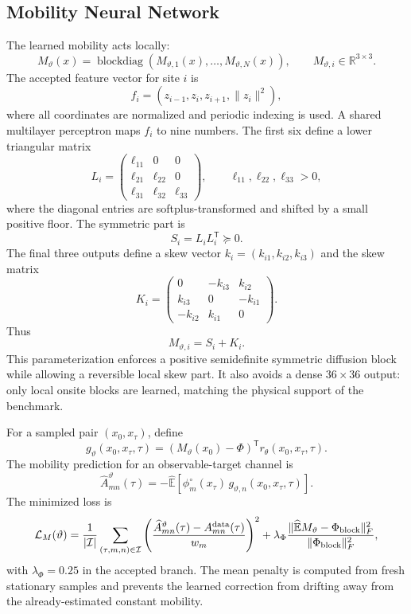 \documentclass[11pt]{article}
\newcommand{\R}{\mathbb{R}}
\newcommand{\E}{\mathbb{E}}
\newcommand{\T}{\mathsf{T}}
\begin{document}
\subsection{Mobility Neural Network}

The learned mobility acts locally:
\[
  M_\vartheta(x)=\operatorname{blockdiag}
  \left(M_{\vartheta,1}(x),\ldots,M_{\vartheta,N}(x)\right),
  \qquad
  M_{\vartheta,i}\in\R^{3\times3}.
\]
The accepted feature vector for site $i$ is
\[
  f_i
  =
  \left(
    z_{i-1},z_i,z_{i+1},\|z_i\|^2
  \right),
\]
where all coordinates are normalized and periodic indexing is used.  A shared
multilayer perceptron maps $f_i$ to nine numbers.  The first six define a lower
triangular matrix
\[
  L_i=
  \begin{pmatrix}
    \ell_{11} & 0 & 0\\
    \ell_{21} & \ell_{22} & 0\\
    \ell_{31} & \ell_{32} & \ell_{33}
  \end{pmatrix},
  \qquad
  \ell_{11},\ell_{22},\ell_{33}>0,
\]
where the diagonal entries are softplus-transformed and shifted by a small
positive floor.  The symmetric part is
\[
  S_i=L_iL_i^\T\succeq0.
\]
The final three outputs define a skew vector $k_i=(k_{i1},k_{i2},k_{i3})$ and
the skew matrix
\[
  K_i=
  \begin{pmatrix}
    0 & -k_{i3} & k_{i2}\\
    k_{i3} & 0 & -k_{i1}\\
    -k_{i2} & k_{i1} & 0
  \end{pmatrix}.
\]
Thus
\[
  M_{\vartheta,i}=S_i+K_i.
\]
This parameterization enforces a positive semidefinite symmetric diffusion
block while allowing a reversible local skew part.  It also avoids a dense
$36\times36$ output: only local onsite blocks are learned, matching the
physical support of the benchmark.

For a sampled pair $(x_0,x_\tau)$, define
\[
  g_\vartheta(x_0,x_\tau,\tau)
  =
  \left(M_\vartheta(x_0)-\Phi\right)^\T
  r_\theta(x_0,x_\tau,\tau).
\]
The mobility prediction for an observable-target channel is
\[
  \widehat A_{mn}^{\vartheta}(\tau)
  =
  -\widehat{\E}\!\left[
    \phi_m^\circ(x_\tau)\,g_{\vartheta,n}(x_0,x_\tau,\tau)
  \right].
\]
The minimized loss is
\[
  \mathcal L_M(\vartheta)
  =
  \frac1{|\mathcal I|}
  \sum_{(\tau,m,n)\in\mathcal I}
  \left(
    \frac{
      \widehat A_{mn}^{\vartheta}(\tau)-A_{mn}^{\rm data}(\tau)
    }{w_m}
  \right)^2
  +
  \lambda_\Phi
  \frac{\|\widehat{\E}M_\vartheta-\Phi_{\rm block}\|_F^2}
       {\|\Phi_{\rm block}\|_F^2},
\]
with $\lambda_\Phi=0.25$ in the accepted branch.  The mean penalty is computed
from fresh stationary samples and prevents the learned correction from drifting
away from the already-estimated constant mobility.
\end{document}
